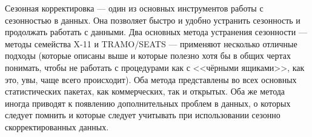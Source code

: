 \documentclass[final,pdftex]{../../template/epsilonj}\usepackage[]{graphicx}\usepackage[]{color}
\begin{document}
Сезонная корректировка --- один из основных инструментов работы с сезонностью в данных. Она позволяет быстро и удобно устранить сезонность и продолжать работать с данными. Два основных метода устранения сезонности --- методы семейства X-11 и TRAMO/SEATS --- применяют несколько отличные подходы (которые описаны выше и которые полезно хотя бы в общих чертах понимать, чтобы не работать с процедурами как с <<чёрными ящиками>>, как это, увы, чаще всего происходит). Оба метода представлены во всех основных статистических пакетах, как коммерческих, так и открытых. Оба же метода иногда приводят к появлению дополнительных проблем в данных, о которых следует помнить и которые следует учитывать при использовании сезонно скорректированных данных.
\end{document}
